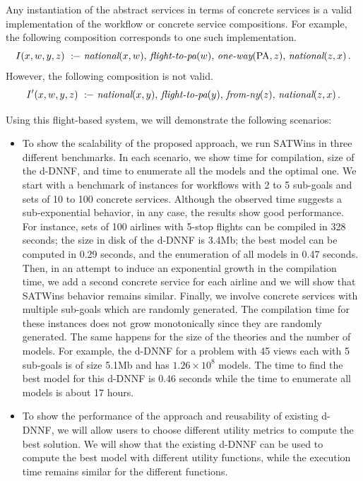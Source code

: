 \documentclass{llncs}
\newcommand{\qrule}{:\!\!-}
\newcommand{\national}{\text{\it national}}
\newcommand{\oneway}{\text{\it one-way}}
\newcommand{\flightPA}{\text{\it flight-to-pa}}
\newcommand{\fromNY}{\text{\it from-ny}}
\newcommand{\PA}{\text{PA}}
\begin{document}
Any instantiation of the abstract services in terms of
concrete services is a valid implementation of the workflow or concrete service compositions.
For example, the following composition corresponds to one such implementation.
\[ I(x,w,y,z)\ \qrule\ \national(x,w),\,\flightPA(w),\,\oneway(\PA,z),\,\national(z,x)\,. \]
However, the following composition is not valid.
\begin{alignat*}{1}
I'(x,w,y,z)\  \qrule\ &\national(x,y),\,\flightPA(y),\,\fromNY(z),\,\national(z,x)\,. \\
\end{alignat*}

Using this flight-based system, we will demonstrate the following scenarios:
\begin{itemize}
\item To show the scalability of the proposed approach, we run SATWins in three different benchmarks. In each scenario, we show time for
compilation, size of the  d-DNNF, and time to enumerate all the models and the optimal one. We start with a benchmark of instances for workflows with 2
to 5 sub-goals and sets of 10 to 100 concrete services. Although the observed
time suggests a sub-exponential behavior, in any case, the results
show good performance. For instance, sets of 100
airlines with 5-stop flights can be compiled in 328 seconds; the size in disk of the d-DNNF is 3.4Mb;
the best model can be computed in 0.29 seconds, and the enumeration of all models in 0.47 seconds.
Then, in an attempt to induce an exponential growth in the compilation time, we add a second concrete service for each airline and we will show that SATWins behavior remains similar. Finally, we  involve concrete services with multiple sub-goals which are randomly generated.  The compilation time for these instances does not grow monotonically
since they are randomly generated. The same happens for the size of
the theories and the number of models. For example, the d-DNNF for 
a problem with 45 views each with 5 sub-goals is of size 5.1Mb and has
$1.26\times 10^8$ models. The time to find the best model for
this d-DNNF is 0.46 seconds while the time to enumerate all models
is about 17 hours.
\item To show the performance of the approach and reusability of existing d-DNNF, we will allow users to choose different utility metrics to compute the best solution.  We will show that the existing d-DNNF can be used to compute the best model with different utility functions, while the execution time remains similar for the different functions. 
\end{itemize}
\end{document}
